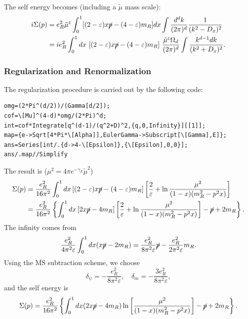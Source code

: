 The self energy becomes (including a $\tilde \mu$ mass scale):
\begin{equation}
\begin{aligned}
	i\Sigma(p)
	&= e_R^2\tilde{\mu}^{\varepsilon} 
		\int_0^1 [(2-\varepsilon)x\cancel{p}-(4-\varepsilon)m_R] dx 
		\int \frac{d^d k}{(2\pi)^d} 
		\frac{1}{(k^2-D_x)^2} \\
	&= ie_R^2 \int_0^1 dx\ [(2-\varepsilon)x\cancel{p}-(4-\varepsilon)m_R]\ 
		\frac{\tilde{\mu}^{\varepsilon}\Omega_d}{(2\pi)^d} 
		\int \frac{k^{d-1} dk}{(k^2+D_x)^2}.
\end{aligned}
\end{equation}


\subsubsection{Regularization and Renormalization}

The regularization procedure is carried out by the following code:

\begin{lstlisting}[style=mathematicaFrameTB]
omg=(2*Pi^(d/2))/(Gamma[d/2]);
cof=\[Mu]^(4-d)*omg/(2*Pi)^d;
int=cof*Integrate[q^(d-1)/(q^2+D)^2,{q,0,Infinity}][[1]];
map={e->Sqrt[4*Pi*\[Alpha]],EulerGamma->Subscript[\[Gamma],E]};
ans=Series[int/.{d->4-\[Epsilon]},{\[Epsilon],0,0}];
ans/.map//Simplify
\end{lstlisting}

The result is ($\mu^2 = 4\pi e^{-\gamma_E} \tilde\mu^2$)
\begin{equation}
\begin{aligned}
	\Sigma(p) 
	&= \frac{e_R^2}{16\pi^2}\int_0^1 dx \left[(2-\varepsilon)x\cancel{p}-(4-\varepsilon)m_R \right] 
	\left[\frac{2}{\varepsilon}+\ln\frac{\mu^2}{(1-x)(m_R^2-p^2 x)}\right] \\
	&= \frac{e_R^2}{16\pi^2} \left\{ \int_0^1 dx \left[2x\cancel{p}-4m_R \right] 
	\left[\frac{2}{\varepsilon}+\ln\frac{\mu^2}{(1-x)(m_R^2-p^2 x)}\right]-\cancel p + 2m_R\right\}.
\end{aligned}
\end{equation}
The infinity comes from
\begin{equation}
	\frac{e_R^2}{4\pi^2\varepsilon}\int_0^1 dx(x\cancel{p}-2m_R)
	= \frac{e_R^2}{8\pi^2\varepsilon}\cancel{p} - \frac{e_R^2}{2\pi^2\varepsilon}m_R.
\end{equation}
Using the $\overline{\mathrm{MS}}$ subtraction scheme, we choose
\begin{equation}
	\delta_{\psi} = -\frac{e_R^2}{8\pi^2\varepsilon},\quad
	\delta_m = -\frac{3 e_R^2}{8\pi^2\varepsilon},
\end{equation}
and the self energy is
\begin{equation}
	\Sigma(p) 
	= \frac{e_R^2}{16\pi^2} \left\{\int_0^1 dx(2x\cancel{p}-4m_R)\ln\left[\frac{\mu^2}{(1-x)(m_R^2-p^2 x)}\right]-\cancel p + 2m_R \right\}.
\end{equation}


